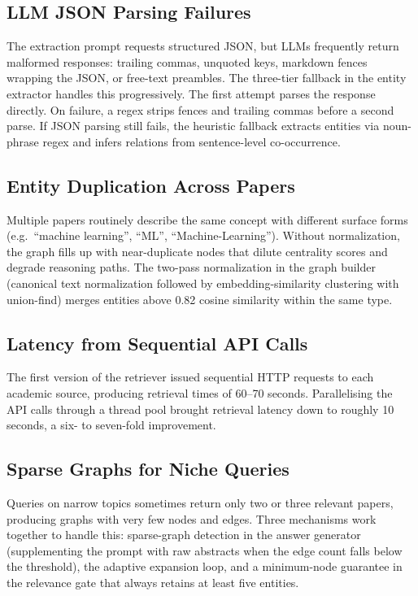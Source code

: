 \documentclass[11pt,a4paper]{article}
\begin{document}
\subsection{LLM JSON Parsing Failures}

The extraction prompt requests structured JSON, but LLMs frequently return
malformed responses: trailing commas, unquoted keys, markdown fences wrapping
the JSON, or free-text preambles. The three-tier fallback in the entity
extractor handles this progressively. The first attempt parses the response
directly. On failure, a regex strips fences and trailing commas before a
second parse. If JSON parsing still fails, the heuristic fallback extracts
entities via noun-phrase regex and infers relations from sentence-level
co-occurrence.

\subsection{Entity Duplication Across Papers}

Multiple papers routinely describe the same concept with different surface
forms (e.g.\ ``machine learning'', ``ML'', ``Machine-Learning''). Without
normalization, the graph fills up with near-duplicate nodes that dilute
centrality scores and degrade reasoning paths. The two-pass normalization
in the graph builder (canonical text normalization followed by
embedding-similarity clustering with union-find) merges entities above 0.82
cosine similarity within the same type.

\subsection{Latency from Sequential API Calls}

The first version of the retriever issued sequential HTTP requests to each
academic source, producing retrieval times of 60--70 seconds. Parallelising
the API calls through a thread pool brought retrieval latency down to
roughly 10 seconds, a six- to seven-fold improvement.

\subsection{Sparse Graphs for Niche Queries}

Queries on narrow topics sometimes return only two or three relevant papers,
producing graphs with very few nodes and edges. Three mechanisms work
together to handle this: sparse-graph detection in the answer generator
(supplementing the prompt with raw abstracts when the edge count falls
below the threshold), the adaptive expansion loop, and a minimum-node
guarantee in the relevance gate that always retains at least five entities.
\end{document}
